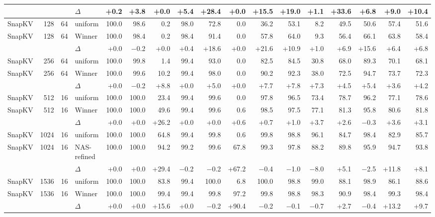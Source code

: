 \begin{table}[t]
\begin{tabular}{@{}l r r l r r r r r r r r r r r r r @{}}
     &  &  & $\Delta$ & +0.2 & +3.8 & +0.0 & +5.4 & +28.4 & +0.0 & +15.5 & +19.0 & +1.1 & +33.6 & +6.8 & +9.0 & +10.4 \\
    \midrule
    SnapKV & 128 & 64 & uniform & 100.0 & 98.6 & 0.2 & 98.0 & 72.8 & 0.0 & 36.2 & 53.1 & 8.2 & 49.5 & 50.6 & 57.4 & 51.6 \\
    SnapKV & 128 & 64 & Winner & 100.0 & 98.4 & 0.2 & 98.4 & 91.4 & 0.0 & 57.8 & 64.0 & 9.3 & 56.4 & 66.1 & 63.8 & 58.4 \\
     &  &  & $\Delta$ & +0.0 & $-$0.2 & +0.0 & +0.4 & +18.6 & +0.0 & +21.6 & +10.9 & +1.0 & +6.9 & +15.6 & +6.4 & +6.8 \\
    \midrule
    SnapKV & 256 & 64 & uniform & 100.0 & 99.8 & 1.4 & 99.4 & 93.0 & 0.0 & 82.5 & 84.5 & 30.8 & 68.0 & 89.3 & 70.1 & 68.1 \\
    SnapKV & 256 & 64 & Winner & 100.0 & 99.6 & 10.2 & 99.4 & 98.0 & 0.0 & 90.2 & 92.3 & 38.0 & 72.5 & 94.7 & 73.7 & 72.3 \\
     &  &  & $\Delta$ & +0.0 & $-$0.2 & +8.8 & +0.0 & +5.0 & +0.0 & +7.7 & +7.8 & +7.3 & +4.5 & +5.4 & +3.6 & +4.2 \\
    \midrule
    SnapKV & 512 & 16 & uniform & 100.0 & 100.0 & 23.4 & 99.4 & 99.6 & 0.0 & 97.8 & 96.5 & 73.4 & 78.7 & 96.2 & 77.1 & 78.6 \\
    SnapKV & 512 & 16 & Winner & 100.0 & 100.0 & 49.6 & 99.4 & 99.6 & 0.6 & 98.5 & 97.5 & 77.1 & 81.3 & 95.8 & 80.6 & 81.8 \\
     &  &  & $\Delta$ & +0.0 & +0.0 & +26.2 & +0.0 & +0.0 & +0.6 & +0.7 & +1.0 & +3.7 & +2.6 & $-$0.3 & +3.6 & +3.1 \\
    \midrule
    SnapKV & 1024 & 16 & uniform & 100.0 & 100.0 & 64.8 & 99.4 & 99.8 & 0.6 & 99.8 & 98.8 & 96.1 & 84.7 & 98.4 & 82.9 & 85.7 \\
    SnapKV & 1024 & 16 & NAS-refined & 100.0 & 100.0 & 94.2 & 99.2 & 99.6 & 67.8 & 99.3 & 97.8 & 88.2 & 89.8 & 95.9 & 94.7 & 93.8 \\
     &  &  & $\Delta$ & +0.0 & +0.0 & +29.4 & $-$0.2 & $-$0.2 & +67.2 & $-$0.4 & $-$1.0 & $-$8.0 & +5.1 & $-$2.5 & +11.8 & +8.1 \\
    \midrule
    SnapKV & 1536 & 16 & uniform & 100.0 & 100.0 & 83.8 & 99.4 & 100.0 & 6.8 & 100.0 & 98.8 & 99.0 & 88.1 & 98.9 & 86.1 & 88.6 \\
    SnapKV & 1536 & 16 & Winner & 100.0 & 100.0 & 99.4 & 99.4 & 99.8 & 97.2 & 99.8 & 98.8 & 98.3 & 90.9 & 98.4 & 99.3 & 98.4 \\
     &  &  & $\Delta$ & +0.0 & +0.0 & +15.6 & +0.0 & $-$0.2 & +90.4 & $-$0.2 & $-$0.1 & $-$0.7 & +2.7 & $-$0.4 & +13.2 & +9.7 \\

\end{tabular}
\end{table}
